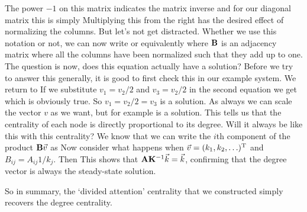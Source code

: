 The power $-1$ on this matrix indicates the matrix inverse and for our diagonal matrix this is simply 
Multiplying this from the right has the desired effect of normalizing the columns. But let's not get distracted. Whether we use this notation or not, we can now write 
or equivalently 
where $\bf B$ is an adjacency matrix where all the columns have been normalized such that they add up to one. The question is now, does this equation actually have a solution? Before we try to answer this generally, it is good to first check this in our example system. We return to  
If we substitute $v_1=v_2/2$ and $v_3=v_2/2$ in the second equation we get 
which is obviously true. So $v_1=v_2/2=v_3$ is a solution. As always we can scale the vector $v$ as we want, but for example 
is a solution. This tells us that the centrality of each node is directly proportional to its degree. Will it always be like this with this centrality? 
We know that we can write the $i$th component of the product ${\bf B}\vec{v}$ as 
Now consider what happens when $\vec{v}=(k_1,k_2,\ldots)^{\rm T}$ and $B_{ij}=A_{ij}1/k_j$. Then 
This shows that ${\bf A}{\bf K}^{-1}\vec{k} = \vec{k}$, confirming that the degree vector is always the steady-state solution.

So in summary, the `divided attention' centrality that we constructed simply recovers the degree centrality.
